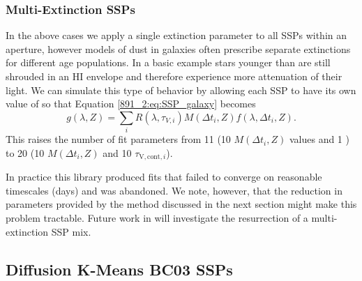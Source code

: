 

\subsubsection{Multi-Extinction SSPs}

In the above cases we apply a single extinction parameter to all SSPs
within an aperture, however models of dust in galaxies
\citep{Charlot00} often prescribe separate extinctions for different
age populations. In a basic example \citep{Charlot00} stars younger
than  are still shrouded in an HI envelope and therefore
experience more attenuation of their light. We can simulate this type
of behavior by allowing each SSP to have its own value of \tauV so
that Equation \ref{891_2:eq:SSP_galaxy} becomes
\begin{equation}
g(\lambda,Z) = \sum_{i} R(\lambda,\tau_{V,i}) M(\Delta t_i,Z)
f(\lambda,\Delta t_i, Z).
\end{equation}
This raises the number of fit parameters from 11 (10 $M(\Delta t_i, Z)$
values and 1 \tauV) to 20 (10 $M(\Delta t_i, Z)$ and 10
$\tau_{\mathrm{V,cont},i}$).

In practice this library produced fits that failed to converge on
reasonable timescales (days) and was abandoned. We note, however, that
the reduction in parameters provided by the method discussed in the
next section might make this problem tractable. Future work in will
investigate the resurrection of a multi-extinction SSP mix.

\subsection{Diffusion K-Means BC03 SSPs}
\label{891_2:sec:bc03_dfk}

